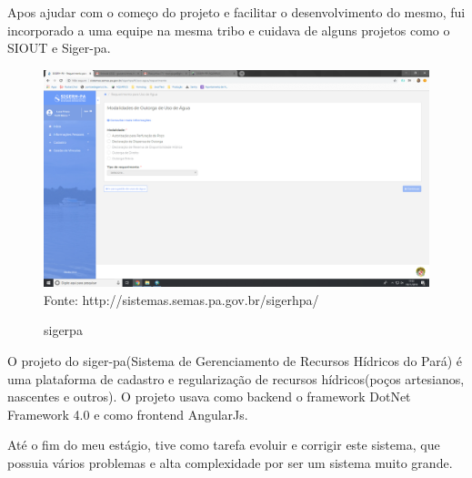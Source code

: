 Apos ajudar com o começo do projeto e facilitar o desenvolvimento do mesmo, fui incorporado a uma equipe na mesma tribo e cuidava de alguns projetos como o SIOUT e Siger-pa.

\begin{figure}[H]
\centering
\caption{sigerpa} %
\includegraphics[scale=0.222]{sigerpa}\\  %
{\small Fonte: http://sistemas.semas.pa.gov.br/sigerhpa/} %
\label{fig:exemplo} %
\end{figure}

O projeto do siger-pa(Sistema de Gerenciamento de Recursos Hídricos do Pará) é uma plataforma de cadastro e regularização de recursos hídricos(poços artesianos, nascentes e outros).
O projeto usava como backend o framework DotNet Framework 4.0 e como frontend AngularJs.

Até o fim do meu estágio, tive como tarefa evoluir e corrigir este sistema, que possuia vários problemas e alta complexidade por ser um sistema muito grande.

